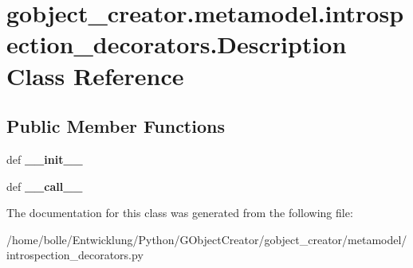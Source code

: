 \hypertarget{classgobject__creator_1_1metamodel_1_1introspection__decorators_1_1Description}{
\section{gobject\_\-creator.metamodel.introspection\_\-decorators.Description Class Reference}
\label{classgobject__creator_1_1metamodel_1_1introspection__decorators_1_1Description}
}
\subsection*{Public Member Functions}
\begin{DoxyCompactItemize}
\item 
\hypertarget{classgobject__creator_1_1metamodel_1_1introspection__decorators_1_1Description_ac15631a1d6323ff937c77ef8e9cc93eb}{
def {\bfseries \_\-\_\-init\_\-\_\-}}
\label{classgobject__creator_1_1metamodel_1_1introspection__decorators_1_1Description_ac15631a1d6323ff937c77ef8e9cc93eb}

\item 
\hypertarget{classgobject__creator_1_1metamodel_1_1introspection__decorators_1_1Description_a796c8d349e7f33896140c54a789bf6b7}{
def {\bfseries \_\-\_\-call\_\-\_\-}}
\label{classgobject__creator_1_1metamodel_1_1introspection__decorators_1_1Description_a796c8d349e7f33896140c54a789bf6b7}

\end{DoxyCompactItemize}


The documentation for this class was generated from the following file:\begin{DoxyCompactItemize}
\item 
/home/bolle/Entwicklung/Python/GObjectCreator/gobject\_\-creator/metamodel/introspection\_\-decorators.py\end{DoxyCompactItemize}
